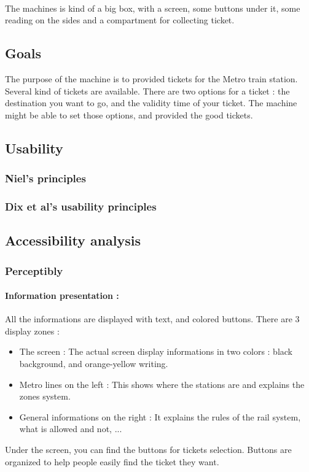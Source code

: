 \documentclass[a4paper,12pt]{article} %
\begin{document}
\paragraph{}The machines is kind of a big box, with a screen, some buttons under it, some reading on the sides and a compartment for collecting ticket.
\subsection{Goals}
The purpose of the machine is to provided tickets for the Metro train station. Several kind of tickets are available. There are two options for a ticket : the destination you want to go, and the validity time of your ticket. The machine might be able to set those options, and provided the good tickets.
\subsection{Usability}
\subsubsection{Niel's principles}
\subsubsection{Dix et al's usability principles}
\subsection{Accessibility analysis}
\subsubsection{Perceptibly}
\paragraph{Information presentation : }All the informations are displayed with text, and colored buttons. There are 3 display zones : 
\begin{itemize}
\item The screen  : The actual screen display informations in two colors : black background, and orange-yellow writing.
\item Metro lines on the left : This shows where the stations are and explains the zones system.
\item General informations on the right : It explains the rules of the rail system, what is allowed and not, ...
\end{itemize}
Under the screen, you can find the buttons for tickets selection.  Buttons are organized to help people easily find the ticket they want.
\end{document}
